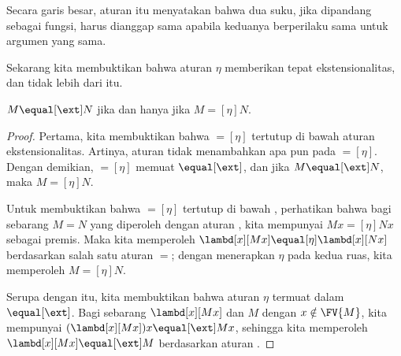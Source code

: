 \documentclass[../../../include/open-logic-section]{subfiles}
\begin{document}
Secara garis besar, aturan itu menyatakan bahwa dua suku, jika dipandang
sebagai fungsi, harus dianggap sama apabila keduanya berperilaku sama untuk
argumen yang sama.

Sekarang kita membuktikan bahwa aturan $\eta$ memberikan tepat
ekstensionalitas, dan tidak lebih dari itu.

\begin{thm}
  $M \equal[\ext] N$ jika dan hanya jika $M \equal[\eta] N$.
\end{thm}

\begin{proof}
  Pertama, kita membuktikan bahwa $\equal[\eta]$ tertutup di bawah aturan
  ekstensionalitas. Artinya, aturan \ext{} tidak menambahkan apa pun pada
  $\equal[\eta]$. Dengan demikian, $\equal[\eta]$ memuat $\equal[\ext]$, dan
  jika $M \equal[\ext] N$, maka $M \equal[\eta] N$.

  Untuk membuktikan bahwa $\equal[\eta]$ tertutup di bawah \ext, perhatikan
  bahwa bagi sebarang $M \equal N$ yang diperoleh dengan aturan \ext{}, kita
  mempunyai $Mx \equal[\eta] Nx$ sebagai premis. Maka kita memperoleh
  $\lambd[x][Mx] \equal[\eta] \lambd[x][Nx]$ berdasarkan salah satu aturan
  $\equal$; dengan menerapkan $\eta$ pada kedua ruas, kita memperoleh
  $M \equal[\eta] N$.

  Serupa dengan itu, kita membuktikan bahwa aturan $\eta$ termuat dalam
  $\equal[\ext]$. Bagi sebarang $\lambd[x][Mx]$ dan $M$ dengan
  $x \notin \FV{M}$, kita mempunyai
  $(\lambd[x][Mx])x \equal[\ext] Mx$, sehingga kita memperoleh
  $\lambd[x][Mx] \equal[\ext] M$ berdasarkan aturan \ext{}.
\end{proof}
\end{document}
